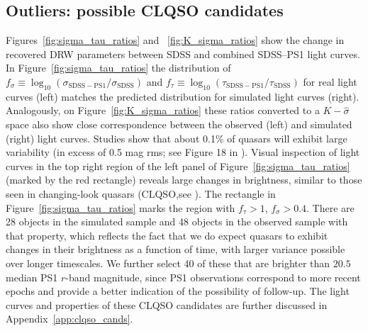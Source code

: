 \documentclass[twocolumn]{aastex62}
\begin{document}
\subsection{Outliers: possible CLQSO candidates}
\label{sec:outliers}
Figures~\ref{fig:sigma_tau_ratios} and ~\ref{fig:K_sigma_ratios} show the change in recovered DRW parameters between SDSS and combined SDSS--PS1 light curves. In Figure~\ref{fig:sigma_tau_ratios} the distribution of $f_{\sigma} \equiv \log_{10}{(\sigma_{\mathrm{SDSS-PS1}} / \sigma_{\mathrm{SDSS}})}$ and $f_{\tau} \equiv \log_{10}{(\tau_{\mathrm{SDSS-PS1}} / \tau_{\mathrm{SDSS}} )}$ for real light curves (left) matches the predicted distribution for simulated light curves (right). Analogously, on Figure~\ref{fig:K_sigma_ratios} these ratios converted to a $K-\hat{\sigma}$ space also show close correspondence between the observed (left) and simulated (right) light curves. Studies show that about 0.1\% of quasars will exhibit large variability (in excess of 0.5 mag rms; see Figure 18 in \citealt{macleod2012}). Visual inspection of light curves in the top right region of the left panel of Figure~\ref{fig:sigma_tau_ratios} (marked by the red rectangle) reveals large changes in brightness, similar to those seen in changing-look quasars (CLQSO,see \citealt{elitzur2014,lamassa2015,schawinski2015,guo2016,ruan2016,runnoe2016,blanchard2017,gezari2017, stern2017, sheng2017,lawrence2018,ross2018,stern2018,yang2018,frederick2019,macleod2019,ruan2019,trakhtenbrot2019,shen2019,sheng2020}). The rectangle in Figure~\ref{fig:sigma_tau_ratios} marks the region with  $f_{\tau} > 1$, $f_{\sigma} > 0.4$. There are 28 objects in the simulated sample and 48 objects in the observed sample with that property, which reflects the fact that we do expect quasars to exhibit changes in their brightness as a function of time, with larger variance possible over longer timescales. We further select 40 of these that are brighter than  $20.5$ median PS1 $r$-band magnitude, since PS1 observations correspond to more recent epochs and provide a better indication of the possibility of follow-up. The light curves and properties of these CLQSO candidates are further discussed in Appendix~\ref{app:clqso_cands}.
\end{document}
